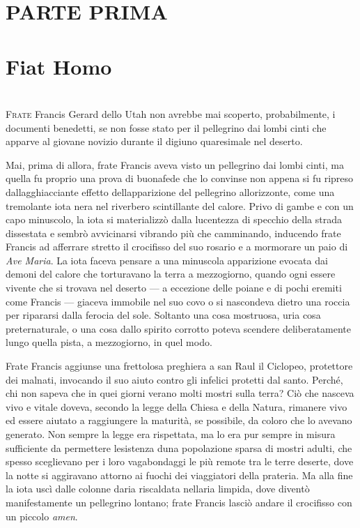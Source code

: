 \mainmatter

{ \chapter*{PARTE PRIMA\\\leavevmode\\\footnotesize{Fiat Homo}}}

\chapter{\phantom{text}}

\lettrine{F}{rate} Francis Gerard dello Utah non avrebbe mai scoperto, probabilmente,
i documenti benedetti, se non fosse stato per il pellegrino dai lombi
cinti che apparve al giovane novizio durante il digiuno quaresimale nel
deserto.

Mai, prima di allora, frate Francis aveva visto un pellegrino dai lombi
cinti, ma quella fu proprio una prova di buonafede che lo convinse non
appena si fu ripreso dall\textquotesingle agghiacciante effetto
dell\textquotesingle apparizione del pellegrino
all\textquotesingle orizzonte, come una tremolante iota nera nel
riverbero scintillante del calore. Privo di gambe e con un capo
minuscolo, la iota si materializzò dalla lucentezza di specchio della
strada dissestata e sembrò avvicinarsi vibrando più che camminando,
inducendo frate Francis ad afferrare stretto il crocifisso del suo
rosario e a mormorare un paio di \emph{Ave Maria}. La iota faceva
pensare a una minuscola apparizione evocata dai demoni del calore che
torturavano la terra a mezzogiorno, quando ogni essere vivente che si
trovava nel deserto --- a eccezione delle poiane e di pochi eremiti come
Francis --- giaceva immobile nel suo covo o si nascondeva dietro una
roccia per ripararsi dalla ferocia del sole. Soltanto una cosa
mostruosa, uria cosa preternaturale, o una cosa dallo spirito corrotto
poteva scendere deliberatamente lungo quella pista, a mezzogiorno, in
quel modo.

Frate Francis aggiunse una frettolosa preghiera a san Raul il Ciclopeo,
protettore dei malnati, invocando il suo aiuto contro gli infelici
protetti dal santo. Perché, chi non sapeva che in quei giorni
v\textquotesingle erano molti mostri sulla terra? Ciò che nasceva vivo e
vitale doveva, secondo la legge della Chiesa e della Natura, rimanere
vivo ed essere aiutato a raggiungere la maturità, se possibile, da
coloro che lo avevano generato. Non sempre la legge era rispettata, ma
lo era pur sempre in misura sufficiente da permettere
l\textquotesingle esistenza d\textquotesingle una popolazione sparsa di
mostri adulti, che spesso sceglievano per i loro vagabondaggi le più
remote tra le terre deserte, dove la notte si aggiravano attorno ai
fuochi dei viaggiatori della prateria. Ma alla fine la iota uscì dalle
colonne d\textquotesingle aria riscaldata nell\textquotesingle aria
limpida, dove diventò manifestamente un pellegrino lontano; frate
Francis lasciò andare il crocifisso con un piccolo \emph{amen}.

